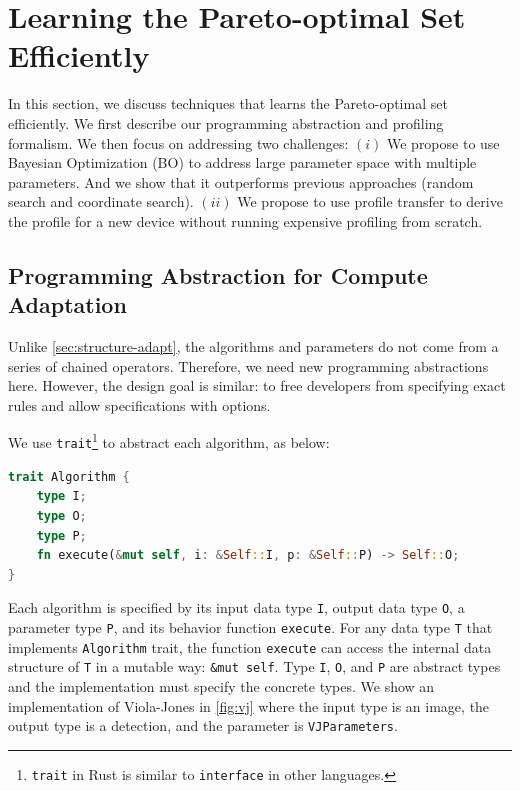 \section{Learning the Pareto-optimal Set Efficiently }
\label{sec:learn-pareto-optim}

In this section, we discuss techniques that learns the Pareto-optimal set
efficiently. We first describe our programming abstraction and profiling
formalism. We then focus on addressing two challenges: $(i)$ We propose to use
Bayesian Optimization (BO) to address large parameter space with multiple
parameters. And we show that it outperforms previous approaches (random search
and coordinate search). $(ii)$ We propose to use profile transfer to derive the
profile for a new device without running expensive profiling from scratch.

\subsection{Programming Abstraction for Compute Adaptation}
\label{sec:progr-abstr}

Unlike \autoref{sec:structure-adapt}, the algorithms and parameters do not come
from a series of chained operators. Therefore, we need new programming
abstractions here. However, the design goal is similar: to free developers from
specifying exact rules and allow specifications with options.

We use \texttt{trait}\footnote{\texttt{trait} in Rust is similar to
  \texttt{interface} in other languages.} to abstract each algorithm, as below:

\begin{lstlisting}[xleftmargin=.1\textwidth, xrightmargin=.1\textwidth, language=Rust]
trait Algorithm {
    type I;
    type O; 
    type P;
    fn execute(&mut self, i: &Self::I, p: &Self::P) -> Self::O;
}
\end{lstlisting}

Each algorithm is specified by its input data type \texttt{I}, output data type
\texttt{O}, a parameter type \texttt{P}, and its behavior function
\texttt{execute}. For any data type \texttt{T} that implements
\texttt{Algorithm} trait, the function \texttt{execute} can access the internal
data structure of \texttt{T} in a mutable way: \texttt{\&mut self}. Type
\texttt{I}, \texttt{O}, and \texttt{P} are abstract types and the implementation
must specify the concrete types. We show an implementation of Viola-Jones in
\autoref{fig:vj} where the input type is an image, the output type is a
detection, and the parameter is \texttt{VJParameters}.

